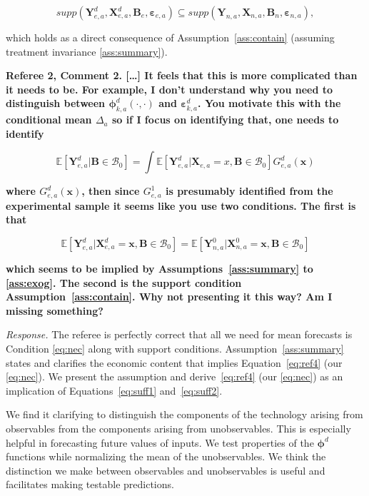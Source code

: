 \begin{equation}
supp( \bm{Y}_{e,a}^d, \bm{X}^d_{e,a}, \bm{B}_e, \bm{\varepsilon}_{e,a} ) \subseteq supp( \bm{Y}_{n,a}, \bm{X}_{n,a}, \bm{B}_n, \bm{\varepsilon}_{n,a} ),  \label{eq:ref4}
\end{equation}

which holds as a direct consequence of Assumption~\ref{ass:contain} (assuming treatment invariance \ref{ass:summary}).

\noindent \textbf{Referee 2, Comment 2. [\ldots] It feels that this is more complicated than it needs to be. For example, I don't understand why you need to distinguish between $\bm{\phi}_{k,a}^d \left( \cdot, \cdot \right) $ and $\bm{\varepsilon}_{k,a}^d$. You motivate this with the conditional mean $\Delta_a$ so if I focus on identifying that, one needs to identify}

\begin{equation}
\mathbb{E} \left[ \bm{Y}_{e,a}^d | \bm{B} \in \mathcal{B}_0 \right] = \int \mathbb{E} \left[ \bm{Y}_{e,a}^d | \bm{X}_{e,a} = x, \bm{B} \in \mathcal{B}_0 \right] G_{e,a}^d \left( \bm{x} \right)
\end{equation}

\textbf{where $G_{e,a}^d \left( \bm{x} \right)$, then since $G_{e,a}^1$ is presumably identified from the experimental sample it seems like you use two conditions. The first is that}

\begin{equation}
\mathbb{E} \left[  \bm{Y}_{e,a}^d | \bm{X}_{e,a}^d = \bm{x},  \bm{B} \in \mathcal{B}_0 \right] = \mathbb{E} \left[  \bm{Y}_{n,a}^0 | \bm{X}_{n,a}^0 = \bm{x},  \bm{B} \in \mathcal{B}_0 \right]  \label{eq:ref4}
\end{equation}

\textbf{which seems to be implied by Assumptions~\ref{ass:summary} to \ref{ass:exog}. The second is the support condition Assumption~\ref{ass:contain}. Why not presenting it this way? Am I missing something?}

\noindent \textit{Response.} The referee is perfectly correct that all we need for mean forecasts is Condition \eqref{eq:nec} along with support conditions. Assumption~\ref{ass:summary} states and clarifies the economic content that implies Equation~\eqref{eq:ref4} (our \eqref{eq:nec}). We present the assumption and derive~\eqref{eq:ref4} (our \eqref{eq:nec}) as an implication of Equations~\eqref{eq:suff1} and~\eqref{eq:suff2}. 

We find it clarifying to distinguish the components of the technology arising from observables from the components arising from unobservables. This is especially helpful in forecasting future values of inputs. We test properties of the $\bm{\phi}^d$ functions while normalizing the mean of the unobservables. We think the distinction we make between observables and unobservables is useful and facilitates making testable predictions.


